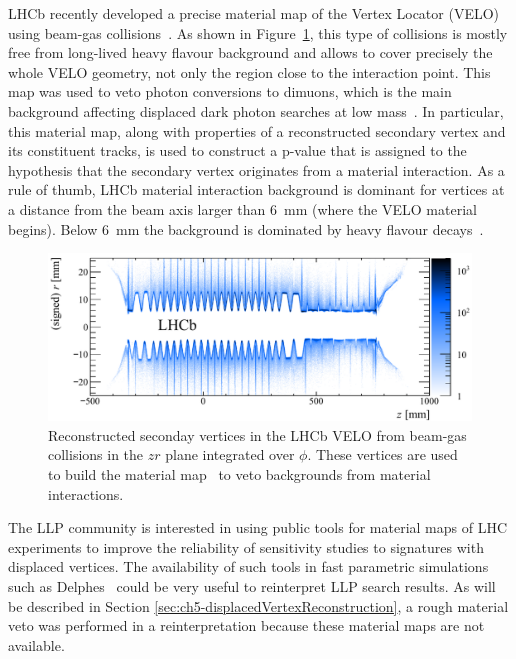LHCb recently developed a precise material map of the Vertex Locator (VELO) using beam-gas collisions~\cite{Alexander:2018png}. As shown in Figure~\ref{fig:lhcbmaterialmap}, this type of collisions is mostly free from long-lived heavy flavour background and allows to cover precisely the whole VELO geometry, not only the region close to the interaction point. This map was used to veto photon conversions to dimuons, which is the main background affecting displaced dark photon searches at low mass~\cite{Aaij:2017rft}.
In particular, this material map, along with properties of a reconstructed secondary vertex and its constituent tracks, is used to construct a p-value that is assigned to the hypothesis that the secondary vertex originates from a material interaction. As a rule of thumb, LHCb material interaction background is dominant for vertices at a distance from the beam axis larger than 6~mm (where the VELO material begins). Below 6~mm the background is dominated by heavy flavour decays~\cite{Ilten:2016tkc}.

\begin{figure}[h]
  \centering
  \includegraphics[width=\textwidth]{figures/lhcbmaterial.pdf}
  \caption{Reconstructed seconday vertices in the LHCb VELO from beam-gas collisions in the $zr$ plane integrated over $\phi$. These vertices are used to build the material map~\cite{Alexander:2018png} to veto backgrounds from material interactions.
  }
  \label{fig:lhcbmaterialmap}
\end{figure}


The LLP community is interested in using public tools for material maps of LHC experiments to improve the reliability of sensitivity studies to signatures with displaced vertices. The availability of such tools in fast parametric simulations such as Delphes~\cite{deFavereau:2013fsa} could be very useful to reinterpret LLP search results. As will be described in Section \ref{sec:ch5-displacedVertexReconstruction}, a rough material veto was performed in a reinterpretation because these material maps are not available.

